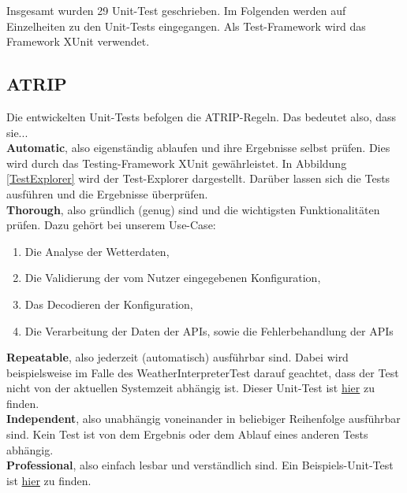 Insgesamt wurden 29 Unit-Test geschrieben. Im Folgenden werden auf Einzelheiten zu den Unit-Tests eingegangen. Als Test-Framework wird das Framework XUnit verwendet.

\subsection{ATRIP}
Die entwickelten Unit-Tests befolgen die ATRIP-Regeln.
Das bedeutet also, dass sie...\\

\noindent
{}
\textbf{Automatic}, also eigenständig ablaufen und ihre Ergebnisse selbst prüfen. Dies wird durch das Testing-Framework XUnit gewährleistet.
In Abbildung \ref{TestExplorer} wird der Test-Explorer dargestellt. Darüber lassen sich die Tests ausführen und die Ergebnisse überprüfen.\\

\noindent
{}
\textbf{Thorough}, also gründlich (genug) sind und die wichtigsten Funktionalitäten prüfen. Dazu gehört bei unserem Use-Case:

\begin{enumerate}[$\hspace{2cm}\bullet$]
\item Die Analyse der Wetterdaten,
\item Die Validierung der vom Nutzer eingegebenen Konfiguration,
\item Das Decodieren der Konfiguration,
\item Die Verarbeitung der Daten der APIs, sowie die Fehlerbehandlung der APIs
\end{enumerate}

\noindent
{}
\textbf{Repeatable}, also jederzeit (automatisch) ausführbar sind. Dabei wird beispielsweise im Falle des WeatherInterpreterTest darauf geachtet, dass der Test nicht von der aktuellen Systemzeit abhängig ist.
Dieser Unit-Test ist \href{https://github.com/Bronzila/WeatherWallpaper/blob/master/WeatherWallpaperTest/WeatherInterpreterTest.cs}{\color{blue}hier} zu finden.\\

\noindent
{}
\textbf{Independent}, also unabhängig voneinander in beliebiger Reihenfolge ausführbar sind. Kein Test ist von dem Ergebnis oder dem Ablauf eines anderen Tests abhängig.\\

\noindent
{}
\textbf{Professional}, also einfach lesbar und verständlich sind.
Ein Beispiels-Unit-Test ist \href{https://github.com/Bronzila/WeatherWallpaper/blob/master/WeatherWallpaperTest/ImageHandlerTest.cs}{\color{blue}hier} zu finden.\\

